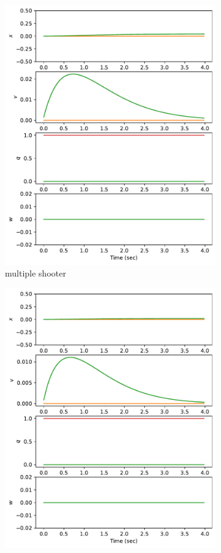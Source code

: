 \documentclass[]{article}
\begin{document}
\begin{figure}[H]
\begin{subfigure}[b]{0.3\textwidth}
		\includegraphics[width=\textwidth]{statehover3.pdf}
		\caption{multiple shooter}
	\end{subfigure}
	\begin{subfigure}[b]{0.3\textwidth}
		\centering
		\includegraphics[width=\textwidth]{statehover2.pdf}

\end{subfigure}
\end{figure}
\end{document}
